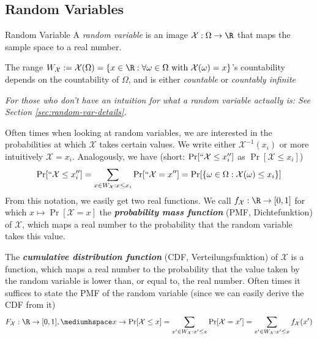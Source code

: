 \newsection
\subsection{Random Variables}
\setcounter{all}{25}
\begin{definition}[]{Random Variable}
    A \textit{random variable} is an image $\mathcal{X}: \Omega \rightarrow \R$ that maps the sample space to a real number.

    The range $W_{\mathcal{X}} := \mathcal{X}(\Omega) = \{ x \in \R : \forall \omega \in \Omega \text{ with } \mathcal{X}(\omega) = x \}$'s countability depends on the countability of $\Omega$, and is either \textit{countable} or \textit{countably infinite}
\end{definition}

\begin{scriptsize}
    \textit{For those who don't have an intuition for what a random variable actually is: See Section \ref{sec:random-var-details}.}
\end{scriptsize}

Often times when looking at random variables, we are interested in the probabilities at which $\mathcal{X}$ takes certain values.
We write either $\mathcal{X}^{-1}(x_i)$ or more intuitively $\mathcal{X} = x_i$. Analogously, we have (short: $\Pr[``\mathcal{X} \leq x_i'']$ as $\Pr[\mathcal{X} \leq x_i]$)
\[
    \Pr[``\mathcal{X} \leq x_i''] = \sum_{x \in W_{\mathcal{X}} : x \leq x_i} \Pr[``\mathcal{X} = x''] = \Pr[\{ \omega \in \Omega : \mathcal{X}(\omega) \leq x_i \}]
\]
From this notation, we easily get two real functions.
We call $f_{\mathcal{X}}: \R \rightarrow [0, 1]$ for which $x \mapsto \Pr[\mathcal{X} = x]$ the \textbf{\textit{probability mass function}} (PMF, Dichtefunktion) of $\mathcal{X}$, which maps a real number to the probability that the random variable takes this value.

The \textbf{\textit{cumulative distribution function}} (CDF, Verteilungsfunktion) of $\mathcal{X}$ is a function, which maps a real number to the probability that the value taken by the random variable is lower than, or equal to, the real number.
Often times it suffices to state the PMF of the random variable (since we can easily derive the CDF from it)
\[
    F_{\mathcal{X}} : \R \rightarrow [0, 1], \mediumhspace x\rightarrow \Pr[\mathcal{X} \leq x] = \sum_{x' \in W_{\mathcal{X}} : x' \leq x} \Pr[\mathcal{X} = x'] = \sum_{x' \in W_{\mathcal{X}} : x' \leq x} f_{\mathcal{X}}(x')
\]


